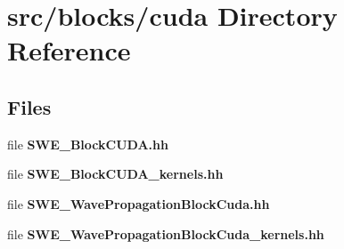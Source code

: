 \section{src/blocks/cuda Directory Reference}
\label{dir_6532cdbe7477d169a48e87e317346fb7}
\subsection*{Files}
\begin{DoxyCompactItemize}
\item 
file {\bf S\-W\-E\-\_\-\-Block\-C\-U\-D\-A.\-hh}
\item 
file {\bf S\-W\-E\-\_\-\-Block\-C\-U\-D\-A\-\_\-kernels.\-hh}
\item 
file {\bf S\-W\-E\-\_\-\-Wave\-Propagation\-Block\-Cuda.\-hh}
\item 
file {\bf S\-W\-E\-\_\-\-Wave\-Propagation\-Block\-Cuda\-\_\-kernels.\-hh}
\end{DoxyCompactItemize}
